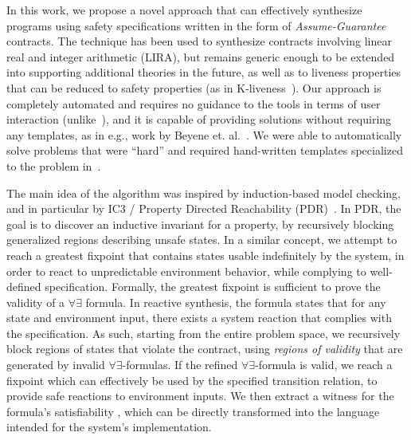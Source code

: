 In this work, we propose a novel approach that can effectively synthesize
programs using safety specifications written in the form of {\em
Assume-Guarantee} contracts. The technique has been used to synthesize contracts involving linear real and integer arithmetic (LIRA),
but remains generic enough to be extended into supporting additional theories
in the future, as well as to liveness properties that can be reduced to safety properties (as in K-liveness~\cite{claessen2012liveness}).  Our approach is completely automated and requires no guidance to the tools in terms of user interaction (unlike~\cite{ryzhyk2014user,ryzhyk2016developing}), and it is capable of providing solutions without requiring any templates, as in e.g., work by Beyene et. al.~\cite{beyene2014constraint}.  We were able to automatically solve problems that were ``hard'' and required hand-written templates specialized to the problem in~\cite{beyene2014constraint}.

The main idea of the algorithm was inspired by induction-based model checking, and in particular by IC3 / Property Directed Reachability (PDR)~\cite{bradley2011sat,een2011efficient}. In PDR, the goal is to discover an inductive invariant for a property, by recursively blocking generalized regions describing unsafe states. In a similar concept, we attempt
to reach a greatest fixpoint that contains states usable indefinitely by the
system, in order to react to unpredictable environment behavior, while
complying to well-defined specification. Formally, the greatest fixpoint is sufficient to prove the validity of a $\forall\exists$ formula. In reactive synthesis, the formula states that for any state and environment input, there exists a system reaction that complies with the specification. As such, starting from the entire
problem space, we recursively block regions of states that violate the contract, using \textit{regions of validity} that are
generated by invalid $\forall\exists$-formulas. 
If the refined
$\forall\exists$-formula is valid, we reach a fixpoint which can effectively be used by the specified transition relation, to
provide safe reactions to environment inputs. We then extract a witness for the
formula's satisfiability
, which can be directly transformed into the
language intended for the system's implementation.

